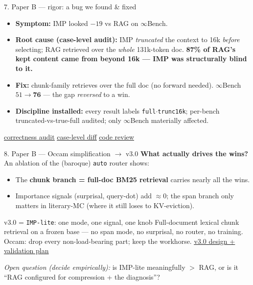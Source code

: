 \documentclass[aspectratio=169]{beamer}
\newcommand{\ghbase}{https://github.com/BDeMo/research-notes/blob/main/notes/plans/08-compressed-context-memory}
\newcommand{\ghB}[2]{\href{\ghbase/papers/paper-b-forgetting-gating/#1}{\color{blue}\underline{#2}}}
\newcommand{\best}[1]{\textbf{#1}}
\begin{document}
\begin{frame}{7. Paper B --- rigor: a bug we found \& fixed}
  \begin{itemize}
    \item \textbf{Symptom:} IMP looked $-19$ vs RAG on $\infty$Bench.
    \item \textbf{Root cause (case-level audit):} IMP \emph{truncated} the context to 16k \emph{before} selecting; RAG retrieved over the \emph{whole} 131k-token doc. \best{87\% of RAG's kept content came from beyond 16k --- IMP was structurally blind to it.}
    \item \textbf{Fix:} chunk-family retrieves over the full doc (no forward needed). $\infty$Bench $51 \to \best{76}$ --- the gap \emph{reversed} to a win.
    \item \textbf{Discipline installed:} every result labels \texttt{full$\cdot$trunc16k}; per-bench truncated-vs-true-full audited; only $\infty$Bench materially affected.
  \end{itemize}
  \begin{block}{}
  \footnotesize \ghB{correctness-audit-2026-07-13.md}{correctness audit} \; \ghB{imp-vs-rag-case-diff-2026-07-13.md}{case-level diff} \; \ghB{code-review-2026-07-13.md}{code review}
  \end{block}
\end{frame}

\begin{frame}{8. Paper B --- Occam simplification $\to$ v3.0}
  \textbf{What actually drives the wins?} An ablation of the (baroque) \texttt{auto} router shows:
  \begin{itemize}\small
    \item The \best{chunk branch = full-doc BM25 retrieval} carries nearly all the wins.
    \item Importance signals (surprisal, query-dot) add $\approx 0$; the span branch only matters in literary-MC (where it still loses to KV-eviction).
  \end{itemize}
  \begin{block}{v3.0 = \texttt{IMP-lite}: one mode, one signal, one knob}
  \footnotesize Full-document lexical chunk retrieval on a frozen base --- no span mode, no surprisal, no router, no training.
  Occam: drop every non-load-bearing part; keep the workhorse. \ghB{method-vNext-2026-07-13.md}{v3.0 design + validation plan}
  \end{block}
  \footnotesize \emph{Open question (decide empirically):} is IMP-lite meaningfully $>$ RAG, or is it ``RAG configured for compression + the diagnosis''?
\end{frame}
\end{document}
